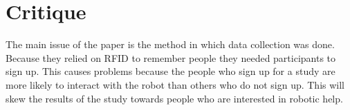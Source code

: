 \documentclass{article}
\begin{document}
\section*{Critique}
The main issue of the paper is the method in which data collection was done. Because they relied on RFID to remember people they needed participants to sign up. This causes problems because the people who sign up for a study are more likely to interact with the robot than others who do not sign up. This will skew the results of the study towards people who are interested in robotic help.
\cite{6256015}
\end{document}
